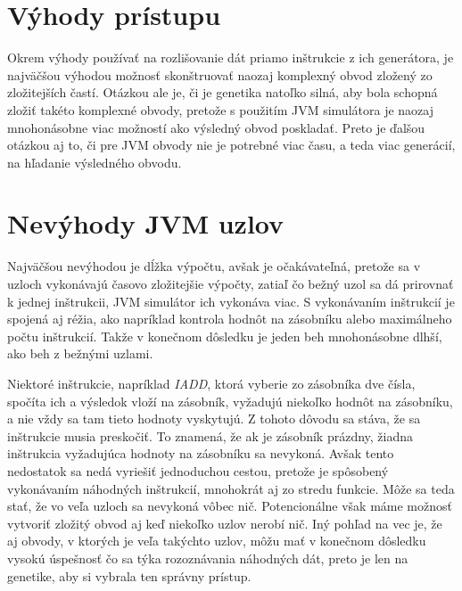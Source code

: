 \section{Výhody prístupu}
\label{sec:advantages}

Okrem výhody používať na rozlišovanie dát priamo inštrukcie z ich generátora, je najväčšou výhodou možnosť skonštruovať naozaj komplexný obvod zložený zo zložitejších častí. Otázkou ale je, či je genetika natoľko silná, aby bola schopná zložiť takéto komplexné obvody, pretože s použitím JVM simulátora je naozaj mnohonásobne viac možností ako výsledný obvod poskladať. Preto je ďalšou otázkou aj to, či pre JVM obvody nie je potrebné viac času, a teda viac generácií, na hľadanie výsledného obvodu.

\section{Nevýhody JVM uzlov}
\label{sec:disadvantages}

Najväčšou nevýhodou je dĺžka výpočtu, avšak je očakávateľná, pretože sa v uzloch vykonávajú časovo zložitejšie výpočty, zatiaľ čo bežný uzol sa dá prirovnať k jednej inštrukcii, JVM simulátor ich vykonáva viac. S vykonávaním inštrukcií je spojená aj réžia, ako napríklad kontrola hodnôt na zásobníku alebo maximálneho počtu inštrukcií. Takže v konečnom dôsledku je jeden beh mnohonásobne dlhší, ako beh z bežnými uzlami.

Niektoré inštrukcie, napríklad \textit{IADD}, ktorá vyberie zo zásobníka dve čísla, spočíta ich a výsledok vloží na zásobník, vyžadujú niekoľko hodnôt na zásobníku, a nie vždy sa tam tieto hodnoty vyskytujú. Z tohoto dôvodu sa stáva, že sa inštrukcie musia preskočiť. To znamená, že ak je zásobník prázdny, žiadna inštrukcia vyžadujúca hodnoty na zásobníku sa nevykoná. Avšak tento nedostatok sa nedá vyriešiť jednoduchou cestou, pretože je spôsobený vykonávaním náhodných inštrukcií, mnohokrát aj zo stredu funkcie. Môže sa teda stať, že vo veľa uzloch sa nevykoná vôbec nič. Potencionálne však máme možnosť vytvoriť zložitý obvod aj keď niekoľko uzlov nerobí nič. Iný pohľad na vec je, že aj obvody, v ktorých je veľa takýchto uzlov, môžu mať v konečnom dôsledku vysokú úspešnosť čo sa týka rozoznávania náhodných dát, preto je len na genetike, aby si vybrala ten správny prístup. 
